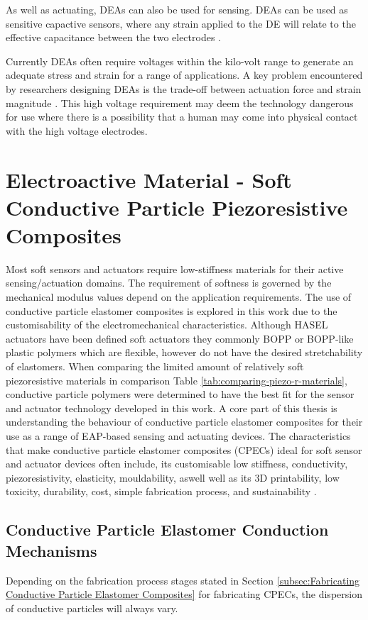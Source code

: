 As well as actuating, DEAs can also be used for sensing. DEAs can be used as sensitive capactive sensors, where any strain applied to the DE will relate to the effective capacitance between the two electrodes \citep{Jung2008,Goulbourne2007,Gisby2013}. 

Currently DEAs often require voltages within the kilo-volt range to generate an adequate stress and strain for a range of applications. A key problem encountered by researchers designing DEAs is the trade-off between actuation force and strain magnitude \citep{Hau2018}. This high voltage requirement may deem the technology dangerous for use where there is a possibility that a human may come into physical contact with the high voltage electrodes.


\section{Electroactive Material - Soft Conductive Particle Piezoresistive Composites}
\label{sec:Soft Piezoresistive Composites}
Most soft sensors and actuators require low-stiffness materials for their active sensing/actuation domains. The requirement of softness is governed by the mechanical modulus values depend on the application requirements. The use of conductive particle elastomer composites is explored in this work due to the customisability of the electromechanical characteristics. Although HASEL actuators have been defined soft actuators they commonly BOPP or BOPP-like plastic polymers which are flexible, however do not have the desired stretchability of elastomers. When comparing the limited amount of relatively soft piezoresistive materials in comparison Table \ref{tab:comparing-piezo-r-materials}, conductive particle polymers were determined to have the best fit for the sensor and actuator technology developed in this work.
A core part of this thesis is understanding the behaviour of conductive particle elastomer composites for their use as a range of EAP-based sensing and actuating devices. The characteristics that make conductive particle elastomer composites (CPECs) ideal for soft sensor and actuator devices often include, its customisable low stiffness, conductivity, piezoresistivity, elasticity, mouldability,  aswell well as its 3D printability, low toxicity, durability, cost, simple fabrication process, and sustainability \cite{Chung2020,Ge2020,HindermannBischoff2001,Kim2012}.


\subsection{Conductive Particle Elastomer Conduction Mechanisms}
Depending on the fabrication process stages stated in Section \ref{subsec:Fabricating Conductive Particle Elastomer Composites} for fabricating CPECs, the dispersion of conductive particles will always vary. 

